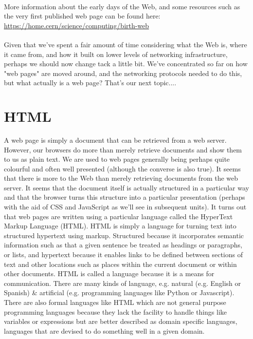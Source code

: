 \documentclass[12pt, a4paper, oneside]{book}
\begin{document}
\paragraph{} More information about the early days of the Web, and some resources such as the very first published web page can be found here:\\
	\url{https://home.cern/science/computing/birth-web}
\paragraph{} Given that we've spent a fair amount of time considering what the Web is, where it came from, and how it built on lower levels of networking infrastructure, perhaps we should now change tack a little bit. We've concentrated so far on how "web pages" are moved around, and the networking protocols needed to do this, but what actually is a  web page? That's our next topic....


\section{HTML}
\paragraph{} A web page is simply a document that can be retrieved from a web server. However, our browsers do more than merely retrieve documents and show them to us as plain text. We are used to web pages generally being perhaps quite colourful and often well presented (although the converse is also true). It seems that there is more to the Web than merely retrieving documents from the web server. It seems that the document itself is actually structured in a particular way and that the browser turns this structure into a particular presentation (perhaps with the aid of CSS and JavaScript as we'll see in subsequent units). It turns out that web pages are written using a particular language called the HyperText Markup Language (HTML). HTML is simply a language for turning text into structured hypertext using markup. Structured because it incorporates semantic information such as that a given sentence be treated as headings or paragraphs, or lists, and hypertext because it enables links to be defined between sections of text and other locations such as places within the current document or within other documents. HTML is called a language because it is a means for communication. There are many kinds of language, e.g. natural (e.g. English or Spanish) \& artificial (e.g. programming languages like Python or Javascript). There are also formal languages like HTML which are not general purpose programming languages because they lack the facility to handle things like variables or expressions but are better described as domain specific languages, languages that are devised to do something well in a given domain.
\end{document}
